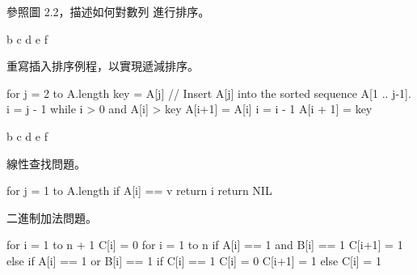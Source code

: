 \startsection[
  title={Insertion sort},
]

\startEXERCISE
參照圖 2.2，描述如何對數列  進行排序。
\stopEXERCISE

\startANSWER
{}
{\externalfigure[output/e2_1_1-2]}{b}
{\externalfigure[output/e2_1_1-3]}{c}
{\externalfigure[output/e2_1_1-4]}{d}
{\externalfigure[output/e2_1_1-5]}{e}
{\externalfigure[output/e2_1_1-6]}{f}
\stopcombination
\stopANSWER

\startEXERCISE
重寫插入排序例程，以實現遞減排序。
\stopEXERCISE
\startANSWER

\startCLRS
for j = 2 to A.length
	key = A[j]
	// Insert A[j] into the sorted sequence A[1 .. j-1].
	i = j - 1
	while i > 0 and A[i] > key
		A[i+1] = A[i]
		i = i - 1
	A[i + 1] = key
\stopCLRS

{\externalfigure[output/e2_1_2-2]}{b}
{\externalfigure[output/e2_1_2-3]}{c}
{\externalfigure[output/e2_1_2-4]}{d}
{\externalfigure[output/e2_1_2-5]}{e}
{\externalfigure[output/e2_1_2-6]}{f}
\stopcombination
\stopANSWER

\startEXERCISE
線性查找問題。
\stopEXERCISE
\startANSWER

\startCLRS
for j = 1 to A.length
	if A[i] == v
		return i
return NIL
\stopCLRS

\stopANSWER

\startEXERCISE
二進制加法問題。
\stopEXERCISE
\startANSWER

\startCLRS
for i = 1 to n + 1
	C[i] = 0
for i = 1 to n
	if A[i] == 1 and B[i] == 1
		C[i+1] = 1
	else if A[i] == 1 or B[i] == 1
		if C[i] == 1
			C[i] = 0
			C[i+1] = 1
		else
			C[i] = 1
\stopCLRS

\stopANSWER

\stopsection

